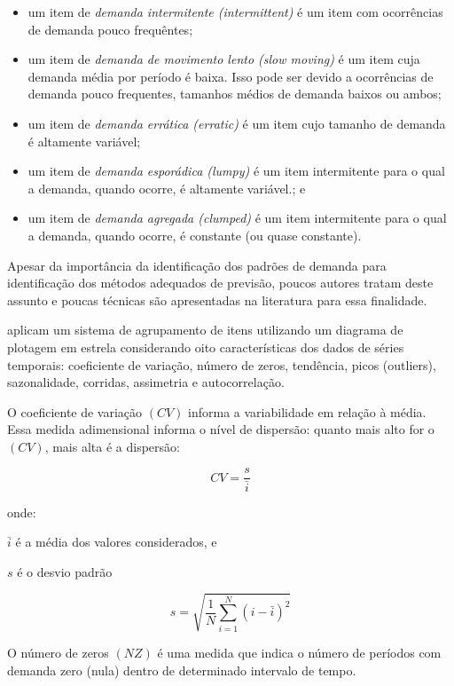 \documentclass{book}
\begin{document}
\begin{itemize}
  \item um item de \emph{demanda intermitente (intermittent)} é um item com ocorrências de demanda pouco frequêntes;
  \item um item de \emph{demanda de movimento lento (slow moving)} é um item cuja demanda média por período é baixa. Isso pode ser devido a ocorrências de demanda pouco frequentes, tamanhos médios de demanda baixos ou ambos;
  \item um item de \emph{demanda errática (erratic)} é um item cujo tamanho de demanda é altamente variável;
  \item um item de \emph{demanda esporádica (lumpy)} é um item intermitente para o qual a demanda, quando ocorre, é altamente variável.; e
  \item um item de \emph{demanda agregada (clumped)} é um item intermitente para o qual a demanda, quando ocorre, é constante (ou quase constante).
\end{itemize}

Apesar da importância da identificação dos padrões de demanda para identificação dos métodos adequados de previsão, poucos autores tratam deste assunto e poucas técnicas são apresentadas na literatura para essa finalidade.

\cite{BusingerRead1999} aplicam um sistema de agrupamento de itens utilizando um diagrama de plotagem em estrela considerando oito características dos dados de séries temporais: coeficiente de variação, número de zeros, tendência, picos (outliers), sazonalidade, corridas, assimetria e autocorrelação.

O coeficiente de variação $(CV)$ informa a variabilidade em relação à média. Essa medida adimensional informa o nível de dispersão: quanto mais alto for o $(CV)$, mais alta é a dispersão:

\begin{equation}
CV = \frac{s}{\bar{i}}
\end{equation}

onde: 

$\bar{i}$ é a média dos valores considerados, e

$s$ é o desvio padrão 

\begin{equation}
s = \sqrt{ \frac{1}{N} \sum_{i=1}^{N}{(i-\bar{i})^2}}
\end{equation}

O número de zeros $(NZ)$ é uma medida que indica o número de períodos com demanda zero (nula) dentro de determinado intervalo de tempo. 
\end{document}
